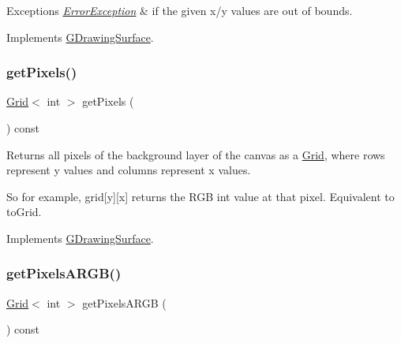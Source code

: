 \begin{DoxyExceptions}{Exceptions}
{\em \mbox{\hyperlink{classErrorException}{Error\+Exception}}} & if the given x/y values are out of bounds. \\
\hline
\end{DoxyExceptions}


Implements \mbox{\hyperlink{classGDrawingSurface_aee10de1ca7da1fc3f3fc0e48286f88f8}{G\+Drawing\+Surface}}.

\mbox{\label{classGCanvas_a430b4965720f3b35f10062a252883e75}} 
\subsubsection{\texorpdfstring{get\+Pixels()}{getPixels()}}
{\footnotesize\ttfamily \mbox{\hyperlink{classGrid}{Grid}}$<$ int $>$ get\+Pixels (\begin{DoxyParamCaption}{ }\end{DoxyParamCaption}) const\hspace{0.3cm}{\ttfamily [virtual]}}



Returns all pixels of the background layer of the canvas as a \mbox{\hyperlink{classGrid}{Grid}}, where rows represent y values and columns represent x values. 

So for example, grid\mbox{[}y\mbox{]}\mbox{[}x\mbox{]} returns the R\+GB int value at that pixel. Equivalent to to\+Grid. 

Implements \mbox{\hyperlink{classGDrawingSurface_a9811240b1241922153dec17d395797cf}{G\+Drawing\+Surface}}.

\mbox{\label{classGCanvas_aca5a19f5f53c5cd29b832a769fde4f68}} 
\subsubsection{\texorpdfstring{get\+Pixels\+A\+R\+G\+B()}{getPixelsARGB()}}
{\footnotesize\ttfamily \mbox{\hyperlink{classGrid}{Grid}}$<$ int $>$ get\+Pixels\+A\+R\+GB (\begin{DoxyParamCaption}{ }\end{DoxyParamCaption}) const\hspace{0.3cm}{\ttfamily [virtual]}}



